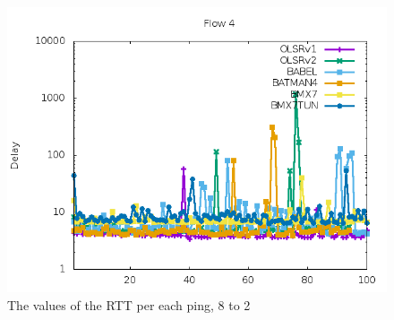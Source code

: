 \documentclass[10pt,onecolumn]{paper}
\begin{document}
\begin{figure}[!htb]
  \centering
  \includegraphics[width=.9\linewidth]{images/failure_test_delay_distribution-IPv6-4-timesequence.png}
    \caption{The values of the RTT per each ping, 8 to 2}
  \label{fig:delaysequence4}
\end{figure}
\end{document}
